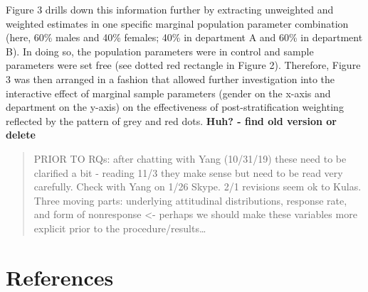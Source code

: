 \documentclass[
  man,mask]{apa7}
\begin{document}
Figure 3 drills down this information further by extracting unweighted and weighted estimates in one specific marginal population parameter combination (here, 60\% males and 40\% females; 40\% in department A and 60\% in department B). In doing so, the population parameters were in control and sample parameters were set free (see dotted red rectangle in Figure 2). Therefore, Figure 3 was then arranged in a fashion that allowed further investigation into the interactive effect of marginal sample parameters (gender on the x-axis and department on the y-axis) on the effectiveness of post-stratification weighting reflected by the pattern of grey and red dots. \textbf{Huh? - find old version or delete}

\begin{quote}
PRIOR TO RQs: after chatting with Yang (10/31/19) these need to be clarified a bit - reading 11/3 they make sense but need to be read very carefully. Check with Yang on 1/26 Skype. 2/1 revisions seem ok to Kulas. Three moving parts: underlying attitudinal distributions, response rate, and form of nonresponse \textless- perhaps we should make these variables more explicit prior to the procedure/results\ldots{}
\end{quote}

\newpage

\hypertarget{references}{%
\section{References}\label{references}}

\begingroup
\setlength{\parindent}{-0.5in}
\setlength{\leftskip}{0.5in}
\end{document}

